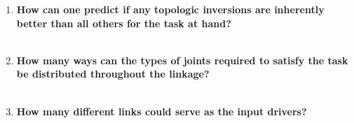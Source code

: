 \documentclass[11pt]{article}
\begin{document}
\begin{enumerate}[leftmargin=*, label=\textbf{\arabic*.}]
  \item \textbf{How can one predict if any topologic inversions are inherently better than all others for the task at hand?}\\[0.25em]
  \\\vspace{0.75em}

  \item \textbf{How many ways can the types of joints required to satisfy the task be distributed throughout the linkage?}\\[0.25em]
  \\\vspace{0.75em}

  \item \textbf{How many different links could serve as the input drivers?}\\[0.25em]
  \\\vspace{0.75em}
\end{enumerate}
\end{document}

